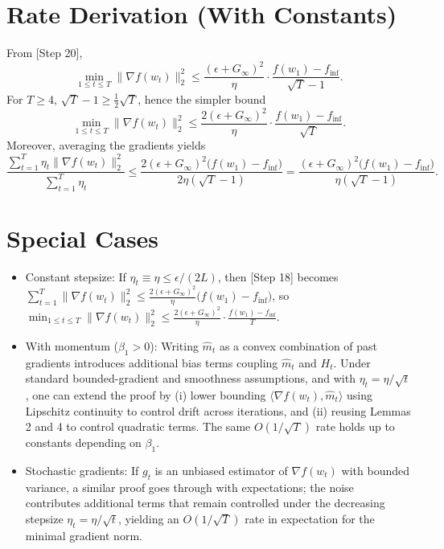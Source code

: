 \documentclass[11pt]{article}
\begin{document}
\section*{Rate Derivation (With Constants)}
From [Step 20],
\[
\min_{1\le t\le T}\|\nabla f(w_t)\|_2^2 \le \frac{(\epsilon+G_\infty)^2}{\eta}\cdot \frac{f(w_1)-f_{\inf}}{\sqrt{T}-1}.
\]
For $T\ge 4$, $\sqrt{T}-1 \ge \frac{1}{2}\sqrt{T}$, hence the simpler bound
\[
\min_{1\le t\le T}\|\nabla f(w_t)\|_2^2 \le \frac{2(\epsilon+G_\infty)^2}{\eta}\cdot \frac{f(w_1)-f_{\inf}}{\sqrt{T}}.
\]
Moreover, averaging the gradients yields
\[
\frac{\sum_{t=1}^T \eta_t \|\nabla f(w_t)\|_2^2}{\sum_{t=1}^T \eta_t}
\le \frac{2(\epsilon+G_\infty)^2\big(f(w_1)-f_{\inf}\big)}{2\eta(\sqrt{T}-1)}
= \frac{(\epsilon+G_\infty)^2\big(f(w_1)-f_{\inf}\big)}{\eta(\sqrt{T}-1)}.
\]

\section*{Special Cases}
\begin{itemize}
\item Constant stepsize: If $\eta_t\equiv \eta \le \epsilon/(2L)$, then [Step 18] becomes
$\sum_{t=1}^T \|\nabla f(w_t)\|_2^2 \le \frac{2(\epsilon+G_\infty)^2}{\eta} \big(f(w_1)-f_{\inf}\big)$,
so $\min_{1\le t\le T}\|\nabla f(w_t)\|_2^2 \le \frac{2(\epsilon+G_\infty)^2}{\eta}\cdot \frac{f(w_1)-f_{\inf}}{T}$.
\item With momentum ($\beta_1>0$): Writing $\hat m_t$ as a convex combination of past gradients introduces additional bias terms coupling $\hat m_t$ and $H_t$. Under standard bounded-gradient and smoothness assumptions, and with $\eta_t=\eta/\sqrt{t}$, one can extend the proof by (i) lower bounding $\langle \nabla f(w_t), \hat m_t\rangle$ using Lipschitz continuity to control drift across iterations, and (ii) reusing Lemmas 2 and 4 to control quadratic terms. The same $O(1/\sqrt{T})$ rate holds up to constants depending on $\beta_1$.
\item Stochastic gradients: If $g_t$ is an unbiased estimator of $\nabla f(w_t)$ with bounded variance, a similar proof goes through with expectations; the noise contributes additional terms that remain controlled under the decreasing stepsize $\eta_t=\eta/\sqrt{t}$, yielding an $O(1/\sqrt{T})$ rate in expectation for the minimal gradient norm.
\end{itemize}
\end{document}

